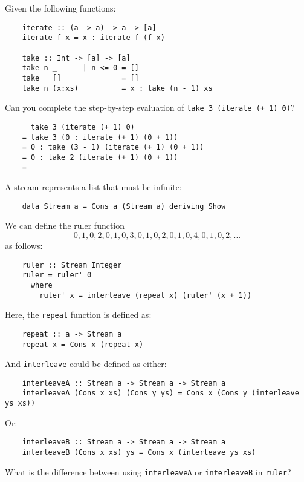 \documentclass[a4paper,10pt,addpoints]{exam}
\begin{document}
\begin{questions}
  Given the following functions:

  \begin{verbatim}
    iterate :: (a -> a) -> a -> [a]
    iterate f x = x : iterate f (f x)

    take :: Int -> [a] -> [a]
    take n _      | n <= 0 = []
    take _ []              = []
    take n (x:xs)          = x : take (n - 1) xs
  \end{verbatim}

  Can you complete the step-by-step evaluation of \texttt{take 3
    (iterate (+ 1) 0)}?

  \begin{verbatim}
      take 3 (iterate (+ 1) 0)
    = take 3 (0 : iterate (+ 1) (0 + 1))
    = 0 : take (3 - 1) (iterate (+ 1) (0 + 1))
    = 0 : take 2 (iterate (+ 1) (0 + 1))
    =
  \end{verbatim}



  \newpage

  \question

  A stream represents a list that must be infinite:

  \begin{verbatim}
    data Stream a = Cons a (Stream a) deriving Show
  \end{verbatim}

  We can define the ruler function
  $$0, 1, 0, 2, 0, 1, 0, 3, 0, 1, 0, 2, 0, 1, 0, 4, 0, 1, 0, 2, ...$$
  as follows:

  \begin{verbatim}
    ruler :: Stream Integer
    ruler = ruler' 0
      where
        ruler' x = interleave (repeat x) (ruler' (x + 1))
  \end{verbatim}

  Here, the \texttt{repeat} function is defined as:

  \begin{verbatim}
    repeat :: a -> Stream a
    repeat x = Cons x (repeat x)
  \end{verbatim}

  And \texttt{interleave} could be defined as either:

  \begin{verbatim}
    interleaveA :: Stream a -> Stream a -> Stream a
    interleaveA (Cons x xs) (Cons y ys) = Cons x (Cons y (interleave ys xs))
  \end{verbatim}

  Or:

  \begin{verbatim}
    interleaveB :: Stream a -> Stream a -> Stream a
    interleaveB (Cons x xs) ys = Cons x (interleave ys xs)
  \end{verbatim}

  What is the difference between using \texttt{interleaveA} or
  \texttt{interleaveB} in \texttt{ruler}?


\end{questions}

\newpage
\end{document}
